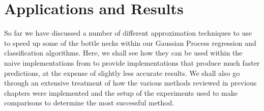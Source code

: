 \section{Applications and Results}\label{Chapter5}

So far we have discussed a number of different approximation techniques to use to speed up some of the bottle necks within our Gaussian Process regression and classification algorithms. Here, we shall see how they can be used within the naive implementations from  to provide implementations that produce much faster predictions, at the expense of slightly less accurate results. We shall also go through an extensive treatment of how the various methods reviewed in previous chapters were implemented and the setup of the experiments used to make comparisons to determine the most successful method.



